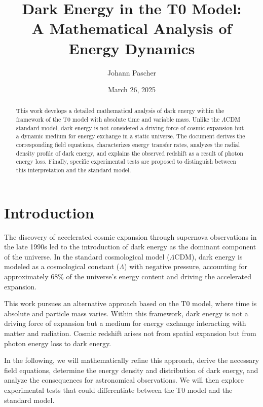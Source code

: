 \documentclass[a4paper,12pt]{article}
\theoremstyle{definition}
\theoremstyle{remark}
\begin{document}
	
	\title{Dark Energy in the T0 Model: \\A Mathematical Analysis of Energy Dynamics}
	\author{Johann Pascher}
	\date{March 26, 2025}
	\maketitle
	
	\begin{abstract}
		This work develops a detailed mathematical analysis of dark energy within the framework of the T0 model with absolute time and variable mass. Unlike the $\Lambda$CDM standard model, dark energy is not considered a driving force of cosmic expansion but a dynamic medium for energy exchange in a static universe. The document derives the corresponding field equations, characterizes energy transfer rates, analyzes the radial density profile of dark energy, and explains the observed redshift as a result of photon energy loss. Finally, specific experimental tests are proposed to distinguish between this interpretation and the standard model.
	\end{abstract}
	
	\tableofcontents
	\newpage
	
	\section{Introduction}
	The discovery of accelerated cosmic expansion through supernova observations in the late 1990s led to the introduction of dark energy as the dominant component of the universe. In the standard cosmological model ($\Lambda$CDM), dark energy is modeled as a cosmological constant ($\Lambda$) with negative pressure, accounting for approximately 68\% of the universe’s energy content and driving the accelerated expansion.
	
	This work pursues an alternative approach based on the T0 model, where time is absolute and particle mass varies. Within this framework, dark energy is not a driving force of expansion but a medium for energy exchange interacting with matter and radiation. Cosmic redshift arises not from spatial expansion but from photon energy loss to dark energy.
	
	In the following, we will mathematically refine this approach, derive the necessary field equations, determine the energy density and distribution of dark energy, and analyze the consequences for astronomical observations. We will then explore experimental tests that could differentiate between the T0 model and the standard model.
	
\end{document}
